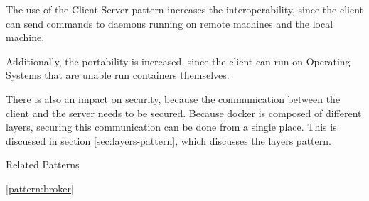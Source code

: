 \begin{patdescription}
The use of the {Client-Server} pattern increases the interoperability, since the client can send commands to daemons running on remote machines and the local machine.

Additionally, the portability is increased, since the client can run on Operating Systems that are unable run containers themselves.

There is also an impact on security, because the communication between the client and the server needs to be secured. Because docker is composed of different layers, securing this communication can be done from a single place. This is discussed in section \ref{sec:layers-pattern}, which discusses the layers pattern.

\item [Related Patterns]
\begin{mynesteditemlist}
\item \ref{pattern:broker}
\end{mynesteditemlist}

\end{patdescription}

